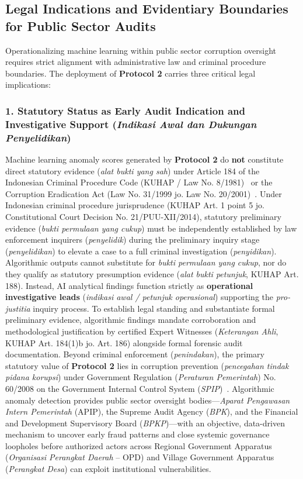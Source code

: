\documentclass[runningheads]{llncs}
\begin{document}
\subsection{Legal Indications and Evidentiary Boundaries for Public Sector Audits}
Operationalizing machine learning within public sector corruption oversight requires strict alignment with administrative law and criminal procedure boundaries. The deployment of \textbf{Protocol 2} carries three critical legal implications:

\subsubsection{1. Statutory Status as Early Audit Indication and Investigative Support (\textit{Indikasi Awal dan Dukungan Penyelidikan})} Machine learning anomaly scores generated by \textbf{Protocol 2} do \textbf{not} constitute direct statutory evidence (\textit{alat bukti yang sah}) under Article 184 of the Indonesian Criminal Procedure Code (KUHAP / Law No. 8/1981)~\cite{ref35} or the Corruption Eradication Act (Law No. 31/1999 jo. Law No. 20/2001)~\cite{ref34}. Under Indonesian criminal procedure jurisprudence (KUHAP Art. 1 point 5 jo. Constitutional Court Decision No. 21/PUU-XII/2014), statutory preliminary evidence (\textit{bukti permulaan yang cukup}) must be independently established by law enforcement inquirers (\textit{penyelidik}) during the preliminary inquiry stage (\textit{penyelidikan}) to elevate a case to a full criminal investigation (\textit{penyidikan}). Algorithmic outputs cannot substitute for \textit{bukti permulaan yang cukup}, nor do they qualify as statutory presumption evidence (\textit{alat bukti petunjuk}, KUHAP Art. 188). Instead, AI analytical findings function strictly as \textbf{operational investigative leads} (\textit{indikasi awal / petunjuk operasional}) supporting the \textit{pro-justitia} inquiry process. To establish legal standing and substantiate formal preliminary evidence, algorithmic findings mandate corroboration and methodological justification by certified Expert Witnesses (\textit{Keterangan Ahli}, KUHAP Art. 184(1)b jo. Art. 186) alongside formal forensic audit documentation.
Beyond criminal enforcement (\textit{penindakan}), the primary statutory value of \textbf{Protocol 2} lies in corruption prevention (\textit{pencegahan tindak pidana korupsi}) under Government Regulation (\textit{Peraturan Pemerintah}) No. 60/2008 on the Government Internal Control System (\textit{SPIP})~\cite{ref33}. Algorithmic anomaly detection provides public sector oversight bodies---\textit{Aparat Pengawasan Intern Pemerintah} (APIP), the Supreme Audit Agency (\textit{BPK}), and the Financial and Development Supervisory Board (\textit{BPKP})---with an objective, data-driven mechanism to uncover early fraud patterns and close systemic governance loopholes before authorized actors across Regional Government Apparatus (\textit{Organisasi Perangkat Daerah} -- OPD) and Village Government Apparatus (\textit{Perangkat Desa}) can exploit institutional vulnerabilities.
\end{document}
